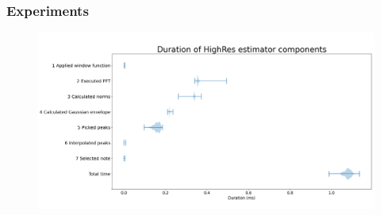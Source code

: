\documentclass[table]{beamer}
\begin{document}
\logo{}
\begin{frame}
\frametitle{Experiments}
    \begin{figure}[H]
        \includegraphics[width=\linewidth]{figures/perfplot.png}
    \end{figure}
\end{frame}


\end{document}
